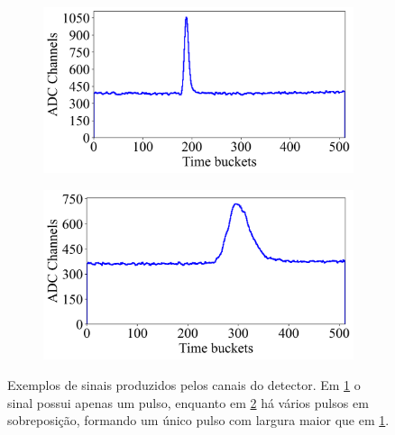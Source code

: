 \documentclass[a4paper,12pt,oneside]{book}
\begin{document}
\begin{figure}[H]
\centering
    \begin{subfigure}[b]{0.48\textwidth}
        \centering
        \includegraphics[scale=0.395]{figs/ex_sinal_1.png}
        \caption{}
        \label{subfig:exemplos_sinais_1}
    \end{subfigure}%
    \hfill
    \begin{subfigure}[b]{0.48\textwidth}
        \centering
        \includegraphics[scale=0.395]{figs/ex_sinal_2.png}
        \caption{}
        \label{subfig:exemplos_sinais_2}
    \end{subfigure}
\caption{Exemplos de sinais produzidos pelos canais do detector. Em \ref{subfig:exemplos_sinais_1} o sinal possui apenas um pulso, enquanto em \ref{subfig:exemplos_sinais_2} há vários pulsos em sobreposição, formando um único pulso com largura maior que em \ref{subfig:exemplos_sinais_1}.}
\label{fig:exemplos_sinais}
\end{figure}
\end{document}
